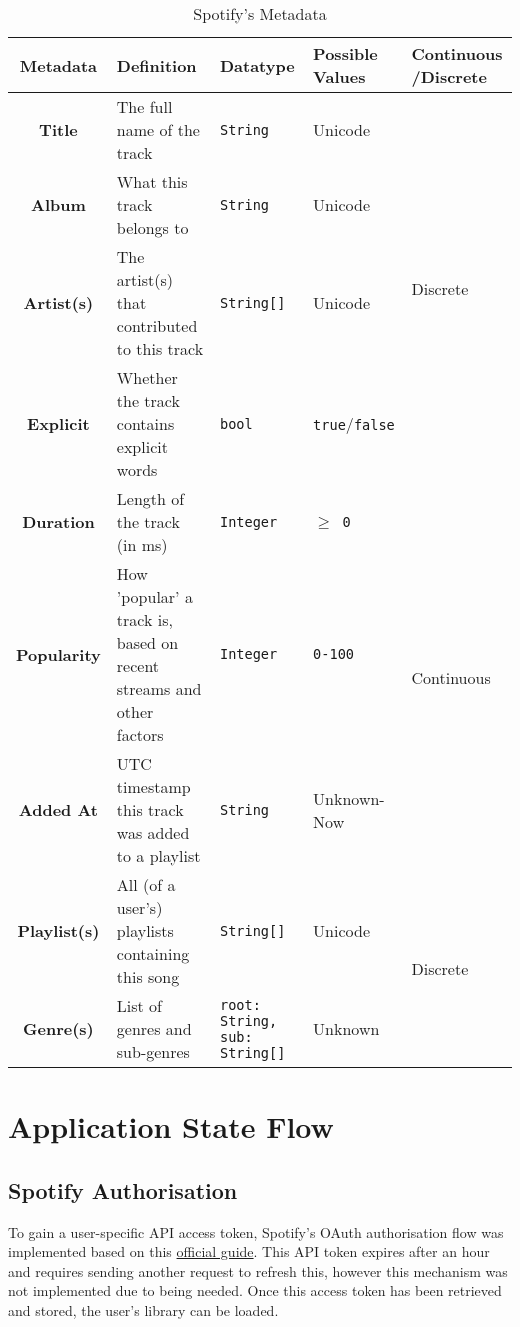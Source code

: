 \begin{longtable}[c]{|c|p{7.5em}|p{7.5em}|p{5em}|p{5.5em}|}
    \caption{Spotify's Metadata \label{table::metadata}}\\%
    \toprule
    \textbf{Metadata} & \textbf{Definition} & \textbf{Datatype} & \textbf{Possible Values} & \textbf{Continuous /Discrete} \\
    \midrule
    \endfirsthead

    \textbf{Title} & The full name of the track & \texttt{String} & Unicode & \multirow{4}{*}{Discrete} \\*
    \cmidrule{1-4}
    \textbf{Album} & What this track belongs to & \texttt{String} & Unicode & \\*
    \cmidrule{1-4}
    \textbf{Artist(s)} & The artist(s) that contributed to this track & \texttt{String[]} & Unicode & \\*
    \cmidrule{1-4}
    \textbf{Explicit} & Whether the track contains explicit words & \texttt{bool} & \texttt{true}/\texttt{false} & \\*
    \cmidrule{1-5}
    \textbf{Duration} & Length of the track (in ms) & \texttt{Integer} & \texttt{\(\ge\) 0} & \multirow{3}{*}{Continuous}\\*
    \cmidrule{1-4}
    \textbf{Popularity} & How 'popular' a track is, based on recent streams and other factors& \texttt{Integer} & \texttt{0-100} & \\*
    \cmidrule{1-4}
    \textbf{Added At} & UTC timestamp this track was added to a playlist & \texttt{String} & Unknown-Now&\\*
    \cmidrule{1-5}
    \textbf{Playlist(s)} & All (of a user's) playlists containing this song & \texttt{String[]} & Unicode & \multirow{2}{*}{Discrete}\\*
    \cmidrule{1-4}
    \textbf{Genre(s)} & List of genres and sub-genres & \texttt{root: String, sub: String[]} & Unknown &\\*
    \midrule
\end{longtable}

\section{Application State Flow}
\subsection{Spotify Authorisation}
To gain a user-specific API access token, Spotify's OAuth authorisation flow was implemented based on this \href{https://developer.spotify.com/documentation/web-api/tutorials/code-pkce-flow}{official guide}. This API token expires after an hour and requires sending another request to refresh this, however this mechanism was not implemented due to being needed. Once this access token has been retrieved and stored, the user's library can be loaded.

